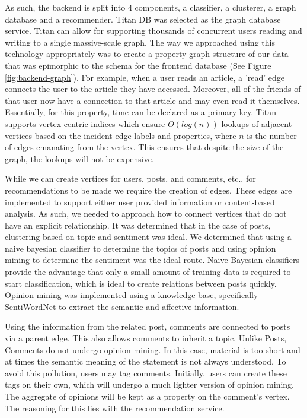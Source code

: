 \documentclass[11pt,letterpaper]{article}
\begin{document}
As such, the backend is split into 4 components, a classifier, a clusterer, a graph database and a recommender. Titan DB was selected as the graph database service. Titan can allow for supporting thousands of concurrent users reading and writing to a single massive-scale graph. The way we approached using this technology appropriately was to create a property graph structure of our data that was epimorphic to the schema for the frontend database (See Figure \ref{fig:backend-graph}). For example, when a user reads an article, a 'read' edge connects the user to the article they have accessed. Moreover, all of the friends of that user now have a connection to that article and may even read it themselves. Essentially, for this property, time can be declared as a primary key. Titan supports vertex-centric indices which ensure $O(log(n))$ lookups of adjacent vertices based on the incident edge labels and properties, where $n$ is the number of edges emanating from the vertex. This ensures that despite the size of the graph, the lookups will not be expensive.

While we can create vertices for users, posts, and comments, etc., for recommendations to be made we require the creation of edges. These edges are implemented to support either user provided information or content-based analysis. As such, we needed to approach how to connect vertices that do not have an explicit relationship. It was determined that in the case of posts, clustering based on topic and sentiment was ideal. We determined that using a naive bayesian classifier to determine the topics of posts and using opinion mining to determine the sentiment was the ideal route. Naive Bayesian classifiers provide the advantage that only a small amount of training data is required to start classification, which is ideal to create relations between posts quickly. Opinion mining was implemented using a knowledge-base, specifically SentiWordNet to extract the semantic and affective information.

Using the information from the related post, comments are connected to posts via a parent edge. This also allows comments to inherit a topic. Unlike Posts, Comments do not undergo opinion mining. In this case, material is too short and at times the semantic meaning of the statement is not always understood. To avoid this pollution, users may tag comments. Initially, users can create these tags on their own, which will undergo a much lighter version of opinion mining. The aggregate of opinions will be kept as a property on the comment's vertex. The reasoning for this lies with the recommendation service.
\end{document}

